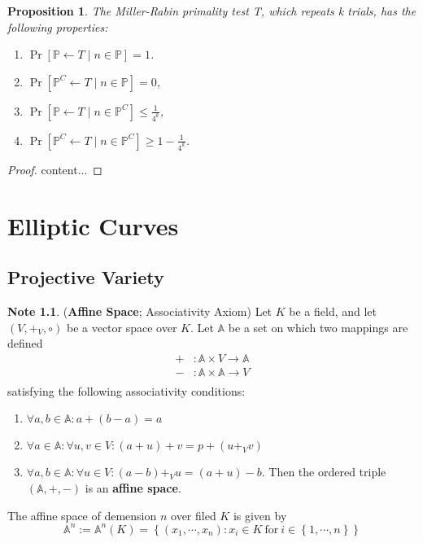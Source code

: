 \documentclass[12pt,openany]{book}
\newtheorem{proposition}[theorem]{Proposition}
\theoremstyle{definition}
\newtheorem*{note}{Note}
\newcommand{\set}[1]{\left\{#1\right\}}
\newcommand{\of}[1]{\left( #1 \right)}
\begin{document}
	\begin{tcolorbox}[colback=white,colframe=procolor,arc=5pt,title={\color{white}\bf }]
		\begin{proposition}
			The Miller-Rabin primality test T, which repeats k trials, has the following properties:
			\begin{enumerate}[(1)]
				\item $\Pr[\mathbb{P}\gets T\mid n\in\mathbb{P}]=1$.
				\item $\Pr[\mathbb{P}^C\gets T\mid n\in\mathbb{P}]=0$,
				\item $\Pr[\mathbb{P}\gets T\mid n\in\mathbb{P}^C]\leq\displaystyle\frac{1}{4^k}$,
				\item $\Pr[\mathbb{P}^C\gets T\mid n\in\mathbb{P}^C]\geq\displaystyle 1-\frac{1}{4^k}$.
			\end{enumerate}
		\end{proposition}
	\end{tcolorbox}
	\begin{proof}
		content...
	\end{proof}
	
	\newpage
	\chapter{Elliptic Curves}
	
	\section{Projective Variety}
	
	\begin{note}{(\textbf{Affine Space}; Associativity Axiom)}
		Let $K$ be a field, and let $\of{V,+_V,\circ}$ be a vector space over $K$. Let $\mathbb{A}$ be a set on which two mappings are defined \begin{align*}
		+&:\mathbb{A}\times V\to\mathbb{A}\\
		-&:\mathbb{A}\times\mathbb{A}\to V\\
		\end{align*} satisfying the following associativity conditions: \begin{enumerate}[(\text{A}1)]
			\item $\forall a,b\in\mathbb{A}:a+(b-a)=a$
			\item $\forall a\in\mathbb{A}:\forall u,v\in V:(a+u)+v=p+(u+_V v)$
			\item $\forall a,b\in\mathbb{A}:\forall u\in V:(a-b)+_V u=(a+u)-b$. Then the ordered triple $(\mathbb{A},+,-)$ is an \textbf{affine space}.
		\end{enumerate} The affine space of demension $n$ over filed $K$ is given by \[
	\mathbb{A}^n:=\mathbb{A}^n(K)=\set{(x_1,\cdots,x_n):x_i\in K\ \text{for}\ i\in\set{1,\cdots,n}}
	\]
	\end{note}
	\vspace{8pt}
\end{document}
